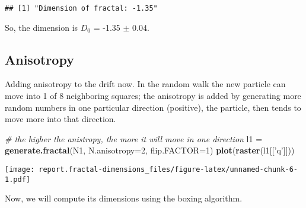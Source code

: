 \documentclass[]{article}
\newenvironment{Shaded}{\begin{snugshade}}{\end{snugshade}}
\newcommand{\CommentTok}[1]{\textcolor[rgb]{0.56,0.35,0.01}{\textit{#1}}}
\newcommand{\DataTypeTok}[1]{\textcolor[rgb]{0.13,0.29,0.53}{#1}}
\newcommand{\DecValTok}[1]{\textcolor[rgb]{0.00,0.00,0.81}{#1}}
\newcommand{\KeywordTok}[1]{\textcolor[rgb]{0.13,0.29,0.53}{\textbf{#1}}}
\newcommand{\NormalTok}[1]{#1}
\newcommand{\OperatorTok}[1]{\textcolor[rgb]{0.81,0.36,0.00}{\textbf{#1}}}
\newcommand{\StringTok}[1]{\textcolor[rgb]{0.31,0.60,0.02}{#1}}
\begin{document}
\begin{Shaded}
\end{Shaded}

\begin{verbatim}
## [1] "Dimension of fractal: -1.35"
\end{verbatim}

So, the dimension is \(D_0\) = -1.35 \(\pm\) 0.04.

\hypertarget{anisotropy}{%
\subsection{Anisotropy}\label{anisotropy}}

Adding anisotropy to the drift now. In the random walk the new particle
can move into 1 of 8 neighboring squares; the anisotropy is added by
generating more random numbers in one particular direction (positive),
the particle, then tends to move more into that direction.

\begin{Shaded}
\begin{Highlighting}[]
\CommentTok{# the higher the anistropy, the more it will move in one direction}
\NormalTok{l1 =}\StringTok{ }\KeywordTok{generate.fractal}\NormalTok{(N1, }\DataTypeTok{N.anisotropy=}\DecValTok{2}\NormalTok{, }\DataTypeTok{flip.FACTOR=}\DecValTok{1}\NormalTok{)}
\KeywordTok{plot}\NormalTok{(}\KeywordTok{raster}\NormalTok{(l1[[}\StringTok{'q'}\NormalTok{]]))}
\end{Highlighting}
\end{Shaded}

\texttt{[image: report.fractal-dimensions\_files/figure-latex/unnamed-chunk-6-1.pdf]}

Now, we will compute its dimensions using the boxing algorithm.

\begin{Shaded}
\end{Shaded}
\end{document}
